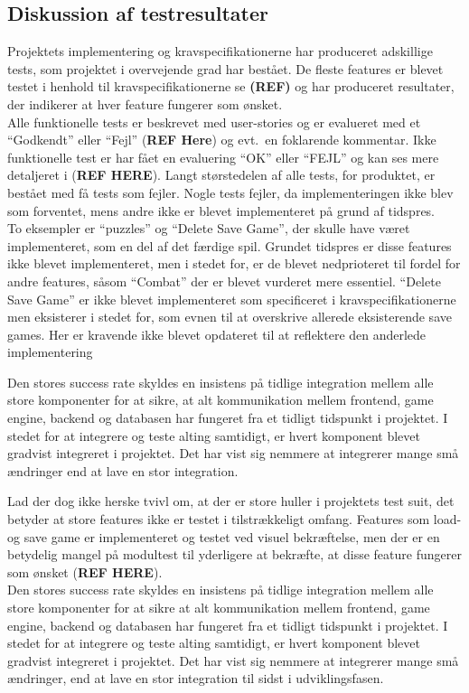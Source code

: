 \subsection{Diskussion af testresultater}
Projektets implementering og kravspecifikationerne har produceret adskillige tests, som 
projektet i overvejende grad har bestået. De fleste features er blevet
testet i henhold til kravspecifikationerne se \textbf{(REF)} og har produceret 
resultater, der indikerer at hver feature fungerer som ønsket. \\

Alle funktionelle tests er beskrevet med user-stories og er evalueret med et ``Godkendt''
eller ``Fejl'' (\textbf{REF Here}) og evt.\ en foklarende kommentar. Ikke funktionelle 
test er har fået en evaluering ``OK'' eller ``FEJL'' og kan ses mere detaljeret i (\textbf{REF HERE}).
Langt størstedelen af alle tests, for produktet, er bestået med få tests som fejler. 
Nogle tests fejler, da implementeringen ikke blev som forventet, mens andre ikke er blevet 
implementeret på grund af tidspres. \\

To eksempler er ``puzzles'' og ``Delete Save Game'', der skulle have været implementeret, som en del af det færdige spil.
Grundet tidspres er disse features ikke blevet implementeret, men i stedet for, er de blevet
nedprioteret til fordel for andre features, såsom ``Combat'' der er blevet vurderet mere essentiel.
``Delete Save Game'' er ikke blevet implementeret som specificeret i kravspecifikationerne men
eksisterer i stedet for, som evnen til at overskrive allerede eksisterende save games. Her er 
kravende ikke blevet opdateret til at reflektere den anderlede implementering

Den stores success rate skyldes en insistens på tidlige integration mellem alle store komponenter for at sikre, at 
alt kommunikation mellem frontend, game engine, backend og databasen har fungeret fra et tidligt 
tidspunkt i projektet. I stedet for at integrere og teste alting samtidigt, er hvert komponent 
blevet gradvist integreret i projektet. Det har vist sig nemmere at integrerer mange små ændringer
end at lave en stor integration.

Lad der dog ikke herske tvivl om, at der er store huller i projektets test suit, det
betyder at store features ikke er testet i tilstrækkeligt omfang. Features som load- og save game er implementeret og testet ved visuel bekræftelse, men der er en betydelig mangel på modultest til yderligere at bekræfte, at disse feature fungerer som ønsket (\textbf{REF HERE}). \\

Den stores success rate skyldes en insistens på tidlige integration mellem alle store komponenter for at sikre at alt kommunikation mellem frontend, game engine, backend og databasen har fungeret fra et tidligt tidspunkt i projektet.
I stedet for at integrere og teste alting samtidigt, er hvert komponent blevet gradvist integreret i projektet. Det har vist sig nemmere at integrerer mange små ændringer, end at lave en stor integration til sidst i udviklingsfasen.


